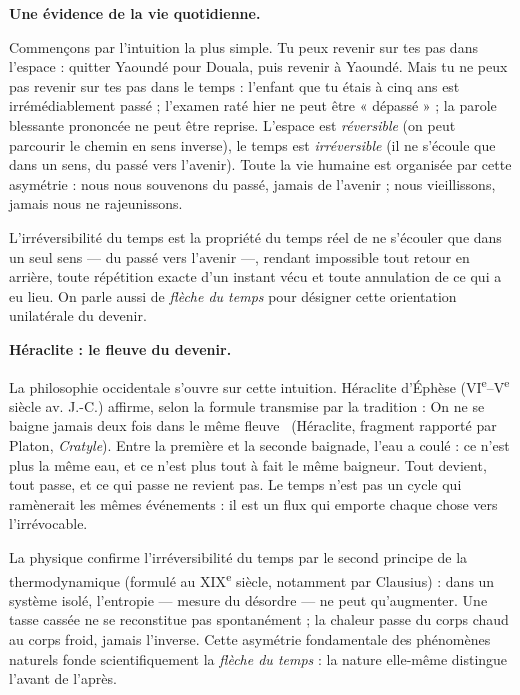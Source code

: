 \documentclass[11pt]{article}
\newcommand{\cle}[1]{{\popxbold\color{popdark}#1}}
\begin{document}
\textbf{Une évidence de la vie quotidienne.}\par
Commençons par l'intuition la plus simple. Tu peux revenir sur tes pas dans l'espace : quitter Yaoundé pour Douala, puis revenir à Yaoundé. Mais tu ne peux pas revenir sur tes pas dans le temps : l'enfant que tu étais à cinq ans est irrémédiablement passé ; l'examen raté hier ne peut être « dépassé » ; la parole blessante prononcée ne peut être reprise. L'espace est \emph{réversible} (on peut parcourir le chemin en sens inverse), le temps est \emph{irréversible} (il ne s'écoule que dans un sens, du passé vers l'avenir). Toute la vie humaine est organisée par cette asymétrie : nous nous souvenons du passé, jamais de l'avenir ; nous vieillissons, jamais nous ne rajeunissons.

\begin{definition}
L'\cle{irréversibilité du temps} est la propriété du temps réel de ne s'écouler que dans un seul sens — du passé vers l'avenir —, rendant impossible tout retour en arrière, toute répétition exacte d'un instant vécu et toute annulation de ce qui a eu lieu. On parle aussi de \emph{flèche du temps} pour désigner cette orientation unilatérale du devenir.
\end{definition}

\textbf{Héraclite : le fleuve du devenir.}\par
La philosophie occidentale s'ouvre sur cette intuition. Héraclite d'Éphèse (VI\textsuperscript{e}--V\textsuperscript{e} siècle av. J.-C.) affirme, selon la formule transmise par la tradition : \guillemotleft On ne se baigne jamais deux fois dans le même fleuve \guillemotright\ (Héraclite, fragment rapporté par Platon, \emph{Cratyle}). Entre la première et la seconde baignade, l'eau a coulé : ce n'est plus la même eau, et ce n'est plus tout à fait le même baigneur. Tout devient, tout passe, et ce qui passe ne revient pas. Le temps n'est pas un cycle qui ramènerait les mêmes événements : il est un flux qui emporte chaque chose vers l'irrévocable.

\begin{propriete}
La physique confirme l'irréversibilité du temps par le \cle{second principe de la thermodynamique} (formulé au XIX\textsuperscript{e} siècle, notamment par Clausius) : dans un système isolé, l'\cle{entropie} — mesure du désordre — ne peut qu'augmenter. Une tasse cassée ne se reconstitue pas spontanément ; la chaleur passe du corps chaud au corps froid, jamais l'inverse. Cette asymétrie fondamentale des phénomènes naturels fonde scientifiquement la \emph{flèche du temps} : la nature elle-même distingue l'avant de l'après.
\end{propriete}
\end{document}
